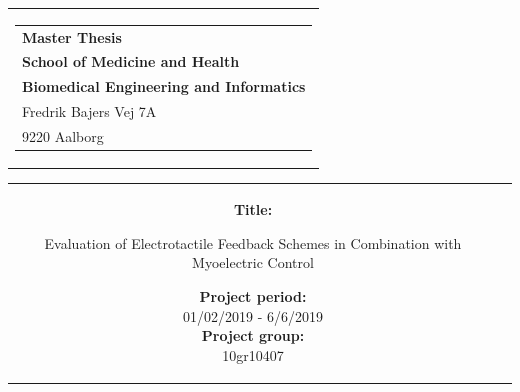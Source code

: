 % 
\thispagestyle{empty}
\begin{titlepage}
	\begin{nopagebreak}
		{\samepage 
			
			\begin{tabular}{r}
				\parbox{\textwidth}{  
					\hfill \hspace{2cm} \parbox{8cm}{\begin{tabular}{l} %
							{\small \textbf{\textcolor{aaublue}{Master Thesis}}}\\
							{\small \textbf{\textcolor{aaublue}{School of Medicine and Health}}}\\
							{\small \textbf{\textcolor{aaublue}{Biomedical Engineering and Informatics}}}\\
							{\small \textcolor{aaublue}{Fredrik Bajers Vej 7A}} \\
							{\small \textcolor{aaublue}{9220 Aalborg}} \\
				\end{tabular}}}
			\end{tabular}
			
			\begin{tabular}{cc}
				\parbox{7cm}{
					
					\textbf{Title:}
					
					Evaluation of Electrotactile Feedback Schemes in
					Combination with Myoelectric Control \\ 
					
%					
					
					
					\parbox{8cm}{
						
						
						\textbf{Project period:}\\
						01/02/2019 - 6/6/2019\\
						
						\textbf{Project group:}\\
						10gr10407\\ %
						
}}
\end{tabular}}
\end{nopagebreak}
\end{titlepage}
